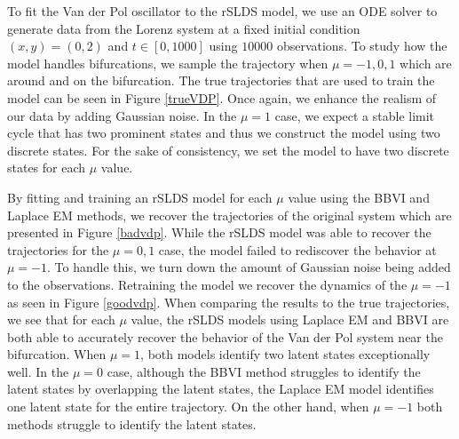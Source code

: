 To fit the Van der Pol oscillator to the rSLDS model, we use an ODE solver to generate data from the Lorenz system at a fixed initial condition $(x,y) = (0,2)$ and $t \in [0,1000]$ using $10000$ observations. To study how the model handles bifurcations, we sample the trajectory when $\mu = -1,0,1$ which are around and on the bifurcation. The true trajectories that are used to train the model can be seen in Figure \ref{trueVDP}. Once again, we enhance the realism of our data by adding Gaussian noise. In the $\mu = 1$ case, we expect a stable limit cycle that has two prominent states and thus we construct the model using two discrete states. For the sake of consistency, we set the model to have two discrete states for each $\mu$ value. 



By fitting and training an rSLDS model for each $\mu$ value using the BBVI and Laplace EM methods, we recover the trajectories of the original system which are presented in Figure \ref{badvdp}. While the rSLDS model was able to recover the trajectories for the $\mu=0,1$ case, the model failed to rediscover the behavior at $\mu = -1$. To handle this, we turn down the amount of Gaussian noise being added to the observations. Retraining the model we recover the dynamics of the $\mu = -1$ as seen in Figure \ref{goodvdp}. When comparing the results to the true trajectories, we see that for each $\mu$ value, the rSLDS models using Laplace EM and BBVI are both able to accurately recover the behavior of the Van der Pol system near the bifurcation. When $\mu = 1$, both models identify two latent states exceptionally well. In the $\mu = 0$ case, although the BBVI method struggles to identify the latent states by overlapping the latent states, the Laplace EM model identifies one latent state for the entire trajectory. On the other hand, when $\mu = -1$ both methods struggle to identify the latent states.
